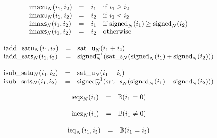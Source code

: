 $$
\begin{array}[t]{@{}lcl@{}l@{}}
{{\mathrm{imax}}}{\mathsf{u}}{{}_{N}(i_1, i_2)} & = & i_1 & \quad \mbox{if}~ i_1 \geq i_2 \\
{{\mathrm{imax}}}{\mathsf{u}}{{}_{N}(i_1, i_2)} & = & i_2 & \quad \mbox{if}~ i_1 < i_2 \\
{{\mathrm{imax}}}{\mathsf{s}}{{}_{N}(i_1, i_2)} & = & i_1 & \quad \mbox{if}~ {{\mathrm{signed}}}_{N}(i_1) \geq {{\mathrm{signed}}}_{N}(i_2) \\
{{\mathrm{imax}}}{\mathsf{s}}{{}_{N}(i_1, i_2)} & = & i_2 & \quad \mbox{otherwise} \\
\end{array}
$$

$$
\begin{array}[t]{@{}lcl@{}l@{}}
{{\mathrm{iadd\_sat}}}{\mathsf{u}}{{}_{N}(i_1, i_2)} & = & {{\mathrm{sat\_u}}}_{N}(i_1 + i_2) \\
{{\mathrm{iadd\_sat}}}{\mathsf{s}}{{}_{N}(i_1, i_2)} & = & {{{{\mathrm{signed}}}_{N}^{{-1}}}}{({{\mathrm{sat\_s}}}_{N}({{\mathrm{signed}}}_{N}(i_1) + {{\mathrm{signed}}}_{N}(i_2)))} \\
\end{array}
$$

$$
\begin{array}[t]{@{}lcl@{}l@{}}
{{\mathrm{isub\_sat}}}{\mathsf{u}}{{}_{N}(i_1, i_2)} & = & {{\mathrm{sat\_u}}}_{N}(i_1 - i_2) \\
{{\mathrm{isub\_sat}}}{\mathsf{s}}{{}_{N}(i_1, i_2)} & = & {{{{\mathrm{signed}}}_{N}^{{-1}}}}{({{\mathrm{sat\_s}}}_{N}({{\mathrm{signed}}}_{N}(i_1) - {{\mathrm{signed}}}_{N}(i_2)))} \\
\end{array}
$$

\vspace{1ex}

$$
\begin{array}[t]{@{}lcl@{}l@{}}
{{\mathrm{ieqz}}}_{N}(i_1) & = & \mathbb{B}(i_1 = 0) \\
\end{array}
$$

$$
\begin{array}[t]{@{}lcl@{}l@{}}
{{\mathrm{inez}}}_{N}(i_1) & = & \mathbb{B}(i_1 \neq 0) \\
\end{array}
$$

\vspace{1ex}

$$
\begin{array}[t]{@{}lcl@{}l@{}}
{{\mathrm{ieq}}}_{N}(i_1, i_2) & = & \mathbb{B}(i_1 = i_2) \\
\end{array}
$$

